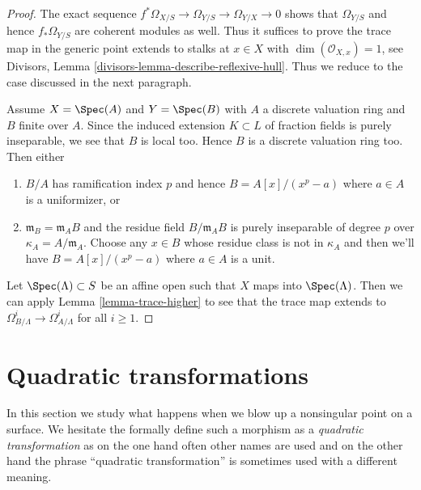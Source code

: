 \begin{proof}
The exact sequence $f^*\Omega_{X/S} \to \Omega_{Y/S} \to \Omega_{Y/X} \to 0$
shows that $\Omega_{Y/S}$ and hence $f_*\Omega_{Y/S}$ are coherent modules
as well. Thus it suffices to prove the trace map in the generic point
extends to stalks at $x \in X$ with $\dim(\mathcal{O}_{X, x}) = 1$, see
Divisors, Lemma \ref{divisors-lemma-describe-reflexive-hull}.
Thus we reduce to the case discussed in the next paragraph.

\medskip\noindent
Assume $X = \Spec(A)$ and $Y = \Spec(B)$ with $A$ a discrete valuation
ring and $B$ finite over $A$. Since the induced extension $K \subset L$
of fraction fields is purely inseparable, we see that $B$ is local too.
Hence $B$ is a discrete valuation ring too. Then either
\begin{enumerate}
\item $B/A$ has ramification index $p$ and hence $B = A[x]/(x^p - a)$
where $a \in A$ is a uniformizer, or
\item $\mathfrak m_B = \mathfrak m_A B$ and the residue field
$B/\mathfrak m_A B$ is purely inseparable of degree $p$ over
$\kappa_A = A/\mathfrak m_A$.
Choose any $x \in B$ whose residue class is not in $\kappa_A$
and then we'll have $B = A[x]/(x^p - a)$ where $a \in A$ is
a unit.
\end{enumerate}
Let $\Spec(\Lambda) \subset S$ be an affine open such that
$X$ maps into $\Spec(\Lambda)$. Then we can apply
Lemma \ref{lemma-trace-higher}
to see that the trace map extends to
$\Omega^i_{B/\Lambda} \to \Omega^i_{A/\Lambda}$
for all $i \geq 1$.
\end{proof}


















\section{Quadratic transformations}
\label{section-quadratic}

\noindent
In this section we study what happens when we blow up a nonsingular point
on a surface. We hesitate the formally define such a morphism as a
{\it quadratic transformation} as on the one hand often other names are
used and on the other hand the phrase ``quadratic transformation'' is
sometimes used with a different meaning.

